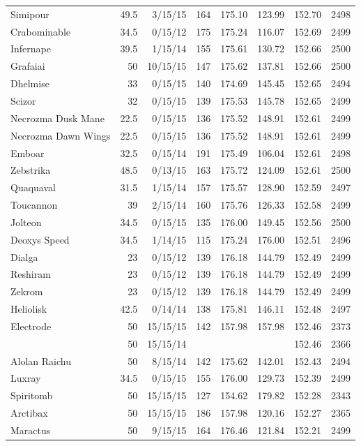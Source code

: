 \begin{longtable}{lrrrrrrr}
Simipour & 49.5 & 3/15/15 & 164 & 175.10 & 123.99 & 152.70 & 2498\\
Crabominable & 34.5 & 0/15/12 & 175 & 175.24 & 116.07 & 152.69 & 2499\\
Infernape & 39.5 & 1/15/14 & 155 & 175.61 & 130.72 & 152.66 & 2500\\
Grafaiai & 50 & 10/15/15 & 147 & 175.62 & 137.81 & 152.66 & 2500\\
Dhelmise & 33 & 0/15/15 & 140 & 174.69 & 145.45 & 152.65 & 2494\\
Scizor & 32 & 0/15/15 & 139 & 175.53 & 145.78 & 152.65 & 2499\\
Necrozma Dusk Mane & 22.5 & 0/15/15 & 136 & 175.52 & 148.91 & 152.61 & 2499\\
Necrozma Dawn Wings & 22.5 & 0/15/15 & 136 & 175.52 & 148.91 & 152.61 & 2499\\
Emboar & 32.5 & 0/15/14 & 191 & 175.49 & 106.04 & 152.61 & 2498\\
Zebstrika & 48.5 & 0/13/15 & 163 & 175.72 & 124.09 & 152.61 & 2500\\
Quaquaval & 31.5 & 1/15/14 & 157 & 175.57 & 128.90 & 152.59 & 2497\\
Toucannon & 39 & 2/15/14 & 160 & 175.76 & 126.33 & 152.58 & 2499\\
Jolteon & 34.5 & 0/15/15 & 135 & 176.00 & 149.45 & 152.56 & 2500\\
Deoxys Speed & 34.5 & 1/14/15 & 115 & 175.24 & 176.00 & 152.51 & 2496\\
Dialga & 23 & 0/15/12 & 139 & 176.18 & 144.79 & 152.49 & 2499\\
Reshiram & 23 & 0/15/12 & 139 & 176.18 & 144.79 & 152.49 & 2499\\
Zekrom & 23 & 0/15/12 & 139 & 176.18 & 144.79 & 152.49 & 2499\\
Heliolisk & 42.5 & 0/14/14 & 138 & 175.81 & 146.11 & 152.48 & 2497\\
Electrode & 50 & 15/15/15 & 142 & 157.98 & 157.98 & 152.46 & 2373\\
 & 50 & 15/15/14 & & & & 152.46 & 2366\\
Alolan Raichu & 50 & 8/15/14 & 142 & 175.62 & 142.01 & 152.43 & 2494\\
Luxray & 34.5 & 0/15/15 & 155 & 176.00 & 129.73 & 152.39 & 2499\\
Spiritomb & 50 & 15/15/15 & 127 & 154.62 & 179.82 & 152.28 & 2343\\
Arctibax & 50 & 15/15/15 & 186 & 157.98 & 120.16 & 152.27 & 2365\\
Maractus & 50 & 9/15/15 & 164 & 176.46 & 121.84 & 152.21 & 2499\\

\end{longtable}
